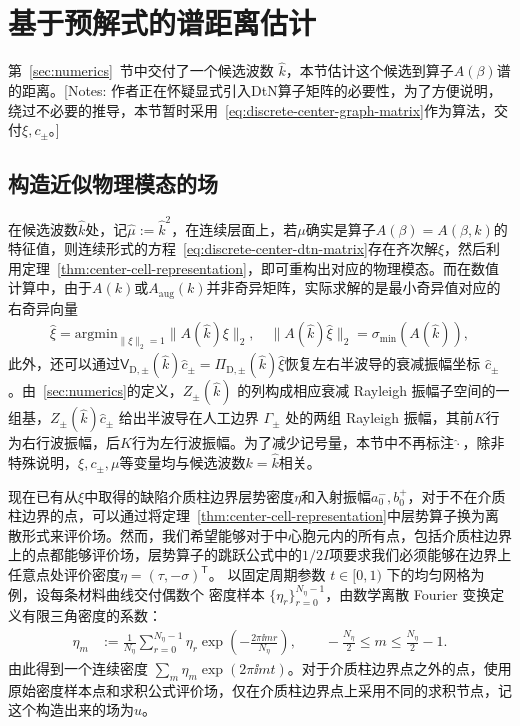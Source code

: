 \section{基于预解式的谱距离估计}
\label{sec:error}

第~\ref{sec:numerics}~节中交付了一个候选波数 $\widehat k$，本节估计这个候选到算子$A(\beta)$谱的距离。[Notes: 作者正在怀疑显式引入DtN算子矩阵的必要性，为了方便说明，绕过不必要的推导，本节暂时采用~\eqref{eq:discrete-center-graph-matrix}作为算法，交付$\xi, c_\pm$。]

\subsection{构造近似物理模态的场}

在候选波数$\widehat k$处，记$\widehat\mu := \widehat{k}^2$，在连续层面上，若$\mu$确实是算子$A(\beta) = A(\beta,k)$的特征值，则连续形式的方程~\eqref{eq:discrete-center-dtn-matrix}存在齐次解$\xi$，然后利用定理~\ref{thm:center-cell-representation}，即可重构出对应的物理模态。而在数值计算中，由于$A(k)$或$A_\mathrm{aug}(k)$并非奇异矩阵，实际求解的是最小奇异值对应的右奇异向量\begin{align}
  \widehat{\xi} = \mathrm{argmin}_{\|\xi\|_2 = 1} \|A(\widehat{k})\xi\|_2,
  \quad \|A(\widehat{k})\widehat{\xi}\|_2 = \sigma_\mathrm{min}(A(\widehat{k})),
\end{align}
此外，还可以通过$\mathsf V_{\mathrm D,\pm}(\widehat k)\widehat{c}_\pm=\Pi_{\mathrm D,\pm}(\widehat{k})\widehat{\xi}$恢复左右半波导的衰减振幅坐标 \(\widehat c_\pm\)。由~\ref{sec:numerics}的定义，\(Z_\pm(\widehat k)\) 的列构成相应衰减 Rayleigh 振幅子空间的一组基，\(Z_\pm(\widehat k)\widehat c_\pm\) 给出半波导在人工边界 \(\Gamma_\pm\) 处的两组 Rayleigh 振幅，其前$K$行为右行波振幅，后$K$行为左行波振幅。为了减少记号量，本节中不再标注$\widehat{\cdot}$，除非特殊说明，$\xi, c_\pm, \mu$等变量均与候选波数$k = \widehat k$相关。

现在已有从$\xi$中取得的缺陷介质柱边界层势密度$\eta$和入射振幅$a_0^-, b_0^+$，对于不在介质柱边界的点，可以通过将定理~\ref{thm:center-cell-representation}中层势算子换为离散形式来评价场。然而，我们希望能够对于中心胞元内的所有点，包括介质柱边界上的点都能够评价场，层势算子的跳跃公式中的$1/2 I$项要求我们必须能够在边界上任意点处评价密度$\eta = (\tau, -\sigma)^\mathsf{T}$。
以固定周期参数 $t\in[0,1)$ 下的均匀网格为例，设每条材料曲线交付偶数个
密度样本 $\{\eta_r\}_{r=0}^{N_\eta-1}$，由数学离散
Fourier 变换定义有限三角密度的系数：
\begin{align}
  \eta_m
  &:=\frac1{N_\eta}\sum_{r=0}^{N_\eta-1}\eta_r
    \exp\!\left(-\frac{2\pi\ii mr}{N_\eta}\right),
  \qquad
  -\frac{N_\eta}{2}\leq m\leq\frac{N_\eta}{2}-1.
  \label{eq:exact-density-dft}
\end{align}
由此得到一个连续密度 $\sum_m\eta_m\exp(2\pi\ii mt)$。对于介质柱边界点之外的点，使用原始密度样本点和求积公式评价场，仅在介质柱边界点上采用不同的求积节点，记这个构造出来的场为$\widehat{u}$。

